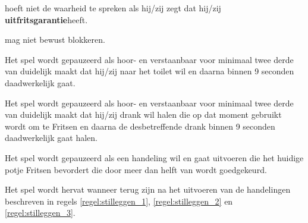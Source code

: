 \vervolgLijst{}
    \item \EenSpeler hoeft niet de waarheid te spreken als hij/zij zegt dat hij/zij \textbf{uitfritsgarantie}\footnotemark[2] heeft.
\eindLijst{}   

\vervolgLijst{}
    \item \EenSpeler mag \medeSpelers niet bewust blokkeren. 
    \label{regel:speler_blokkeren}
\eindLijst{}   


\newpage
{}


\vervolgLijst{}
    \item Het spel wordt gepauzeerd als \eenSpeler hoor- en verstaanbaar voor minimaal twee derde van \alleSpelers duidelijk maakt dat hij/zij naar het toilet wil en daarna binnen 9 seconden daadwerkelijk gaat.
    \label{regel:stilleggen_1}
\eindLijst{}

\vervolgLijst{}
    \item Het spel wordt gepauzeerd als \eenSpeler hoor- en verstaanbaar voor minimaal twee derde van \alleSpelers duidelijk maakt dat hij/zij drank wil halen die op dat moment gebruikt wordt om te Fritsen en daarna de desbetreffende drank binnen 9 seconden daadwerkelijk gaat halen.
    \label{regel:stilleggen_2}
\eindLijst{}

\vervolgLijst{}
    \item Het spel wordt gepauzeerd als \eenSpeler een handeling wil en gaat uitvoeren die het huidige potje Fritsen bevordert die door meer dan helft van \alleSpelers wordt goedgekeurd.
    \label{regel:stilleggen_3}
\eindLijst{}

\vervolgLijst{}
    \item Het spel wordt hervat wanneer \alleSpelers terug zijn na het uitvoeren van de handelingen beschreven in regels \ref{regel:stilleggen_1}, \ref{regel:stilleggen_2} en \ref{regel:stilleggen_3}. 
    \label{regel:stilleggen_4}
\eindLijst{} 



